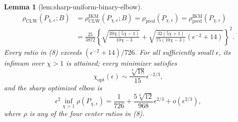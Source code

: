 \documentclass{article}
\newtheorem{lemma}{Lemma}
\begin{document}
\begin{lemma}[lem:sharp-uniform-binary-elbow]
\[\begin{aligned}
 \rho_{\mathrm{CLW}}(P_{\chi,\epsilon};B)
 &=\rho_{\mathrm{CLW}}^{\mathrm{IKM}}(P_{\chi,\epsilon};B)
 =\rho_{\mathrm{pred}}(P_{\chi,\epsilon})
 =\rho_{\mathrm{pred}}^{\mathrm{IKM}}(P_{\chi,\epsilon})\\
 &=\frac{25}{3872}
 \left\{
 \sqrt{\frac{20\chi(5\chi-1)}{10\chi-3}}
 +\sqrt{\frac{32(5\chi+1)}{75(10\chi-3)}
 (\epsilon^{-2}+14)}
 \right\}^{2}.                                            \tag{8}
\end{aligned}
\]
Every ratio in (8) exceeds \((\epsilon^{-2}+14)/726\). For all sufficiently small \(\epsilon\), its infimum over \(\chi>1\) is attained; every minimizer satisfies
\[
 \chi_{\mathrm{opt}}(\epsilon)
 \sim\frac{\sqrt[3]{18}}{15}\epsilon^{-2/3},             \tag{9}
\]
and the sharp optimized elbow is
\[
 \epsilon^2\inf_{\chi>1}\rho(P_{\chi,\epsilon})
 =\frac1{726}+\frac{5\sqrt[3]{12}}{968}\epsilon^{2/3}
 +o(\epsilon^{2/3}),                                      \tag{10}
\]
where \(\rho\) is any of the four center ratios in (8).
\end{lemma}
\end{document}
